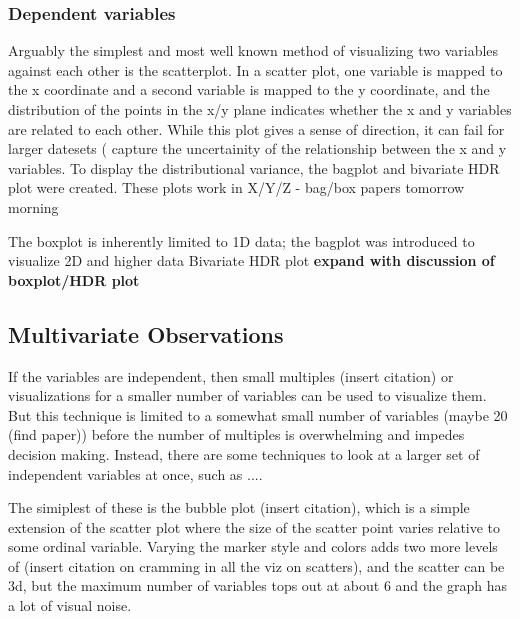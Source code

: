 \documentclass[../main.tex]{subfiles}
\begin{document}
\subsubsection{Dependent variables}
Arguably the simplest and most well known method of visualizing two
variables against each other is the scatterplot\cite{friendly2005}. In
a scatter plot, one variable is mapped to the x coordinate and a
second variable is mapped to the y coordinate, and the distribution of the
points in the x/y plane indicates whether the x and y variables are related to
each other. While this plot gives a sense of direction, it can fail for larger
datesets (%
capture the uncertainity of the relationship between the x and y variables. To
display the distributional variance, the bagplot and bivariate HDR plot were
created. These plots work in X/Y/Z - bag/box papers tomorrow morning

\begin{figure}
  \end{figure}
  The boxplot is inherently limited to 1D data; the bagplot was
  introduced to
  visualize 2D and higher data \cite{rousseeuw1999}
  Bivariate HDR plot \cite{hyndman1996} \textbf{expand with discussion
  of
    boxplot/HDR plot}
    


\subsection{Multivariate Observations}
If the variables are independent, then small multiples (insert citation) or
visualizations for a smaller number of variables can be used to visualize
them. But this technique is limited to a somewhat small number of variables
(maybe 20 (find paper)) before the number of multiples is overwhelming and
impedes decision making. Instead, there are some techniques to look at a larger
set of independent variables at once, such as ....

The simiplest of these is the bubble plot (insert citation), which is a simple
extension of the scatter plot where the size of the scatter point varies
relative to some ordinal variable. Varying the marker style and colors adds two
more levels of (insert citation on cramming in all the viz on scatters), and
the scatter can be 3d, but the maximum number of variables tops out at about 6
and the graph has a lot of visual noise.
\end{document}
